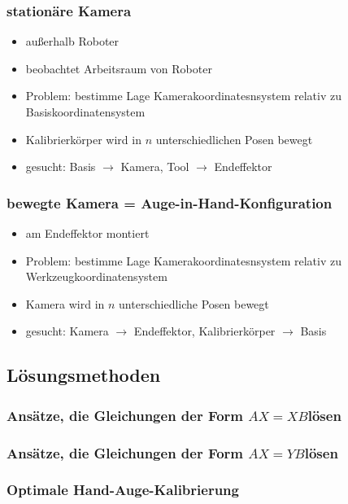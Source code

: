 \documentclass[11pt]{article}
\begin{document}
\subsubsection{stationäre Kamera}
\begin{itemize}
    \item außerhalb Roboter
    \item beobachtet Arbeitsraum von Roboter
    \item Problem: bestimme Lage Kamerakoordinatesnsystem relativ zu Basiskoordinatensystem
    \item Kalibrierkörper wird in $n$ unterschiedlichen Posen bewegt
    \item gesucht: Basis $\rightarrow$ Kamera, Tool $\rightarrow$ Endeffektor
\end{itemize}

\subsubsection{bewegte Kamera = Auge-in-Hand-Konfiguration}
\begin{itemize}
    \item am Endeffektor montiert
    \item Problem: bestimme Lage Kamerakoordinatesnsystem relativ zu Werkzeugkoordinatensystem
    \item Kamera wird in $n$ unterschiedliche Posen bewegt
    \item gesucht: Kamera $\rightarrow$ Endeffektor, Kalibrierkörper $\rightarrow$ Basis
\end{itemize}


\subsection{Lösungsmethoden}

\subsubsection{Ansätze, die Gleichungen der Form $AX = XB$lösen}

\subsubsection{Ansätze, die Gleichungen der Form $AX = YB$lösen}

\subsubsection{Optimale Hand-Auge-Kalibrierung}
\end{document}
